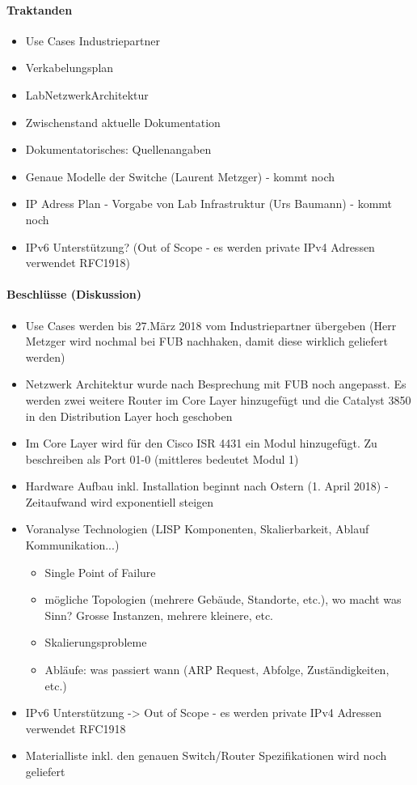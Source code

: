 \paragraph{Traktanden}
\begin{itemize}	
	\item Use Cases Industriepartner
	\item Verkabelungsplan
	\item LabNetzwerkArchitektur
	\item Zwischenstand aktuelle Dokumentation
	\item Dokumentatorisches: Quellenangaben
	\item Genaue Modelle der Switche (Laurent Metzger) - kommt noch
	\item IP Adress Plan - Vorgabe von Lab Infrastruktur (Urs Baumann) - kommt noch
	\item IPv6 Unterstützung? (Out of Scope - es werden private IPv4 Adressen verwendet RFC1918)
\end{itemize}

\paragraph{Beschlüsse (Diskussion)}
\begin{itemize}	
	\item Use Cases werden bis 27.März 2018 vom Industriepartner übergeben (Herr Metzger wird nochmal bei FUB nachhaken, damit diese wirklich geliefert werden)
	\item Netzwerk Architektur wurde nach Besprechung mit FUB noch angepasst. Es werden zwei weitere Router im Core Layer hinzugefügt und die Catalyst 3850 in den Distribution Layer hoch geschoben
	\item Im Core Layer wird für den Cisco ISR 4431 ein Modul hinzugefügt. Zu beschreiben als Port 01-0 (mittleres bedeutet Modul 1)
	\item Hardware Aufbau inkl. Installation beginnt nach Ostern (1. April 2018) - Zeitaufwand wird exponentiell steigen
	\item Voranalyse Technologien (LISP Komponenten, Skalierbarkeit, Ablauf Kommunikation...)
	\begin{itemize}
		\item Single Point of Failure
		\item mögliche Topologien (mehrere Gebäude, Standorte, etc.), wo macht was Sinn? Grosse Instanzen, mehrere kleinere, etc.
		\item Skalierungsprobleme
		\item Abläufe: was passiert wann (ARP Request, Abfolge, Zuständigkeiten, etc.)
	\end{itemize}
	\item IPv6 Unterstützung -> Out of Scope - es werden private IPv4 Adressen verwendet RFC1918
	\item Materialliste inkl. den genauen Switch/Router Spezifikationen wird noch geliefert
\end{itemize}

